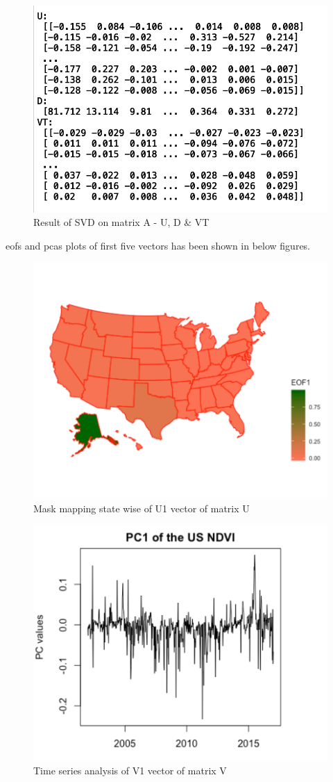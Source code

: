     \begin{figure}[H]
            \centering
            \includegraphics[width=0.70\linewidth]{figures/ch5/svd_result_matrix.png}
            \caption{\label{fig:svd_result_matrices} Result of SVD on matrix A - U, D \& VT}
    \end{figure}
    
    \gls{eof}s and \gls{pca}s plots of first five vectors has been shown in below figures.
    
     \begin{figure}[H]
            \centering
            \includegraphics[width=0.70\linewidth]{figures/ch5/SVD/eof1.png}
            \caption{\label{fig:EOF_1} Mask mapping state wise of U1 vector of matrix U}
    \end{figure}
    
     \begin{figure}[H]
            \centering
            \includegraphics[width=0.70\linewidth]{figures/ch5/SVD/pc1.png}
            \caption{\label{fig:V_1} Time series analysis of V1 vector of matrix V}
    \end{figure}
    
